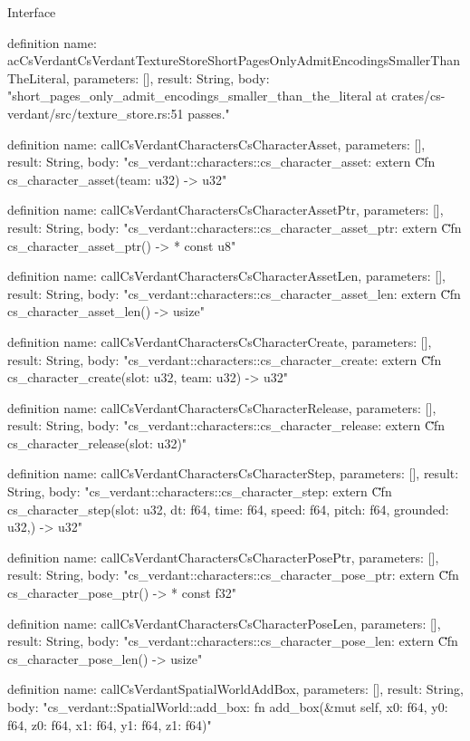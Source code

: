 \begin{lexlean}{Interface}
\begin{semanticmodule}
definition{
  name: acCsVerdantCsVerdantTextureStoreShortPagesOnlyAdmitEncodingsSmallerThanTheLiteral,
  parameters: [],
  result: String,
  body: "short_pages_only_admit_encodings_smaller_than_the_literal at crates/cs-verdant/src/texture_store.rs:51 passes."
}

definition{
  name: callCsVerdantCharactersCsCharacterAsset,
  parameters: [],
  result: String,
  body: "cs_verdant::characters::cs_character_asset: extern \"C\" fn cs_character_asset(team: u32) -> u32"
}

definition{
  name: callCsVerdantCharactersCsCharacterAssetPtr,
  parameters: [],
  result: String,
  body: "cs_verdant::characters::cs_character_asset_ptr: extern \"C\" fn cs_character_asset_ptr() -> * const u8"
}

definition{
  name: callCsVerdantCharactersCsCharacterAssetLen,
  parameters: [],
  result: String,
  body: "cs_verdant::characters::cs_character_asset_len: extern \"C\" fn cs_character_asset_len() -> usize"
}

definition{
  name: callCsVerdantCharactersCsCharacterCreate,
  parameters: [],
  result: String,
  body: "cs_verdant::characters::cs_character_create: extern \"C\" fn cs_character_create(slot: u32, team: u32) -> u32"
}

definition{
  name: callCsVerdantCharactersCsCharacterRelease,
  parameters: [],
  result: String,
  body: "cs_verdant::characters::cs_character_release: extern \"C\" fn cs_character_release(slot: u32)"
}

definition{
  name: callCsVerdantCharactersCsCharacterStep,
  parameters: [],
  result: String,
  body: "cs_verdant::characters::cs_character_step: extern \"C\" fn cs_character_step(slot: u32, dt: f64, time: f64, speed: f64, pitch: f64, grounded: u32,) -> u32"
}

definition{
  name: callCsVerdantCharactersCsCharacterPosePtr,
  parameters: [],
  result: String,
  body: "cs_verdant::characters::cs_character_pose_ptr: extern \"C\" fn cs_character_pose_ptr() -> * const f32"
}

definition{
  name: callCsVerdantCharactersCsCharacterPoseLen,
  parameters: [],
  result: String,
  body: "cs_verdant::characters::cs_character_pose_len: extern \"C\" fn cs_character_pose_len() -> usize"
}

definition{
  name: callCsVerdantSpatialWorldAddBox,
  parameters: [],
  result: String,
  body: "cs_verdant::SpatialWorld::add_box: fn add_box(&mut self, x0: f64, y0: f64, z0: f64, x1: f64, y1: f64, z1: f64)"
}


\end{semanticmodule}
\end{lexlean}
